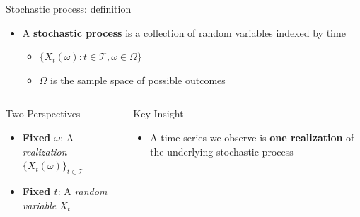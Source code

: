 \documentclass[9pt, aspectratio=169, t]{beamer}
\begin{document}
\begin{frame}{Stochastic process: definition}
    \begin{defn}
        \begin{itemize}\setlength{\itemsep}{0pt}
            \item A \textbf{stochastic process} is a collection of random variables indexed by time
            \begin{itemize}
                \item $\{X_t(\omega) : t \in \mathcal{T}, \omega \in \Omega\}$
                \item $\Omega$ is the sample space of possible outcomes
            \end{itemize}
        \end{itemize}
    \end{defn}

    \vspace{0.1cm}

    \begin{columns}[T]
        \begin{block}{Two Perspectives}
            \begin{itemize}\setlength{\itemsep}{0pt}
                \item \textbf{Fixed $\omega$}: A \textit{realization} $\{X_t(\omega)\}_{t \in \mathcal{T}}$
                \item \textbf{Fixed $t$}: A \textit{random variable} $X_t$
            \end{itemize}
        \end{block}
        \begin{exampleblock}{Key Insight}
            \begin{itemize}\setlength{\itemsep}{0pt}
                \item A time series we observe is \textbf{one realization} of the underlying stochastic process
            \end{itemize}
        \end{exampleblock}
    \end{columns}
\end{frame}
\end{document}
